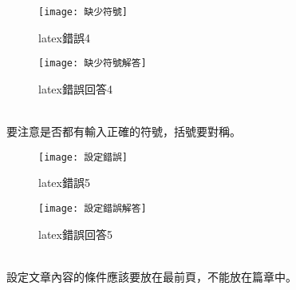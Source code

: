 \begin{figure}[ht]
  \begin{minipage}{0.5\textwidth}
    \centering
    \texttt{[image: 缺少符號]}
    \caption{latex錯誤4}
  \end{minipage}%
  \begin{minipage}{0.5\textwidth}
    \centering
    \texttt{[image: 缺少符號解答]}
    \caption{latex錯誤回答4}
  \end{minipage}
\end{figure}\\

要注意是否都有輸入正確的符號，括號要對稱。\\

\begin{figure}[ht]
  \begin{minipage}{0.5\textwidth}
    \centering
    \texttt{[image: 設定錯誤]}
    \caption{latex錯誤5}
  \end{minipage}%
  \begin{minipage}{0.5\textwidth}
    \centering
    \texttt{[image: 設定錯誤解答]}
    \caption{latex錯誤回答5}
  \end{minipage}
\end{figure}\\

設定文章內容的條件應該要放在最前頁，不能放在篇章中。
\newpage
